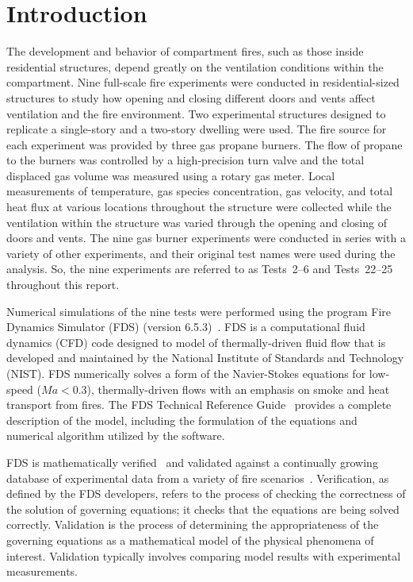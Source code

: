 
\renewcommand{\thechapter}{1}

\chapter{Introduction}
The development and behavior of compartment fires, such as those inside residential structures, depend greatly on the ventilation conditions within the compartment. Nine full-scale fire experiments were conducted in residential-sized structures to study how opening and closing different doors and vents affect ventilation and the fire environment. Two experimental structures designed to replicate a single-story and a two-story dwelling were used. The fire source for each experiment was provided by three gas propane burners. The flow of propane to the burners was controlled by a high-precision turn valve and the total displaced gas volume was measured using a rotary gas meter. Local measurements of temperature, gas species concentration, gas velocity, and total heat flux at various locations throughout the structure were collected while the ventilation within the structure was varied through the opening and closing of doors and vents. The nine gas burner experiments were conducted in series with a variety of other experiments, and their original test names were used during the analysis. So, the nine experiments are referred to as Tests~2--6 and Tests~22--25 throughout this report.

Numerical simulations of the nine tests were performed using the program Fire Dynamics Simulator (FDS) (version 6.5.3)~\cite{FDS_Users_Guide}. FDS is a computational fluid dynamics (CFD) code designed to model of thermally-driven fluid flow that is developed and maintained by the National Institute of Standards and Technology (NIST). FDS numerically solves a form of the Navier-Stokes equations for low-speed ($Ma < 0.3$), thermally-driven flows with an emphasis on smoke and heat transport from fires. The FDS Technical Reference Guide~\cite{FDS_Tech_Guide} provides a complete description of the model, including the formulation of the equations and numerical algorithm utilized by the software. 

FDS is mathematically verified~\cite{FDS_Verification_Guide} and validated against a continually growing database of experimental data from a variety of fire scenarios~\cite{FDS_Validation_Guide}. Verification, as defined by the FDS developers, refers to the process of checking the correctness of the solution of governing equations; it checks that the equations are being solved correctly. Validation is the process of determining the appropriateness of the governing equations as a mathematical model of the physical phenomena of interest. Validation typically involves comparing model results with experimental measurements.   

